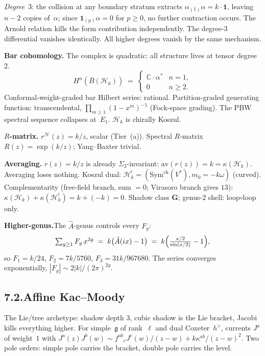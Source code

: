 \documentclass[11pt,reqno]{amsart}
\theoremstyle{definition}
\theoremstyle{remark}
\providecommand{\cH}{\mathcal{H}}
\providecommand{\barB}{\bar{B}}
\providecommand{\Sym}{\mathrm{Sym}}
\providecommand{\fg}{\mathfrak{g}}
\providecommand{\bC}{\mathbb{C}}
\numberwithin{equation}{section}
\begin{document}
\emph{Degree~$3$}: the collision at any boundary stratum extracts
$\alpha_{(1)}\alpha=k\cdot\mathbf{1}$, leaving $n-2$ copies
of~$\alpha$; since $\mathbf{1}_{(p)}\alpha=0$ for $p\ge 0$,
no further contraction occurs. The Arnold relation kills the
form contribution independently. The degree-$3$ differential
vanishes identically. All higher degrees vanish by the same
mechanism.

\medskip\noindent\textbf{Bar cohomology.}\enspace
The complex is quadratic: all structure lives at tensor degree~$2$.
\[
H^n(\barB(\cH_k))\;=\;
\begin{cases}
\bC\cdot\alpha^* & n=1,\\
0 & n\ge 2.
\end{cases}
\]
Conformal-weight-graded bar Hilbert series: rational.
Partition-graded generating function: transcendental,
$\prod_{m\ge 1}(1-x^m)^{-1}$ (Fock-space grading).
The PBW spectral sequence collapses at~$E_1$. $\cH_k$ is
chirally Koszul.

\medskip\noindent\textbf{$R$-matrix.}\enspace
$r^{\cH}(z)=k/z$, scalar (Tier~(a)). Spectral $R$-matrix
$R(z)=\exp(k/z)$; Yang--Baxter trivial.

\medskip\noindent\textbf{Averaging.}\enspace
$r(z)=k/z$ is already $\Sigma_2$-invariant: $\mathrm{av}(r(z))=k
=\kappa(\cH_k)$. Averaging loses nothing. Koszul dual:
$\cH_k^!=(\Sym^{\mathrm{ch}}(V^*),m_0=-k\omega)$ (curved).
Complementarity (free-field branch, sum $=0$; Virasoro branch
gives $13$):
$\kappa(\cH_k)+\kappa(\cH_k^!)=k+(-k)=0$.
Shadow class $\mathbf{G}$; genus-$2$ shell: loop$\circ$loop only.

\medskip\noindent\textbf{Higher-genus.}\enspace The $\hat A$-genus controls every $F_g$:
\begin{equation}\label{eq:ahat-universality-preface-b}
\textstyle\sum_{g\ge 1} F_g\, x^{2g}
\;=\;
k\bigl(\hat A(ix)-1\bigr)
\;=\;
k\Bigl(\tfrac{x/2}{\sin(x/2)}-1\Bigr),
\end{equation}
so $F_1 = k/24$, $F_2 = 7k/5760$, $F_3 = 31k/967680$. The series
converges exponentially, $|F_g| \sim 2|k|/(2\pi)^{2g}$.

\subsection*{7.2.\quad Affine Kac--Moody}

The Lie/tree archetype: shadow depth $3$, cubic shadow is the
Lie bracket, Jacobi kills everything higher. For simple~$\fg$
of rank~$\ell$ and dual Coxeter~$h^\vee$, currents $J^a$ of
weight~$1$ with
$J^a(z)J^b(w)\sim f^{ab}{}_cJ^c(w)/(z{-}w)+k\kappa^{ab}/(z{-}w)^2$.
Two pole orders: simple pole carries the bracket, double pole
carries the level.
\end{document}

